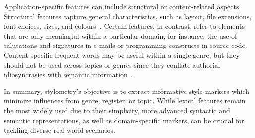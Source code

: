 Application-specific features can include structural or content-related aspects. 
Structural features capture general characteristics, such as layout, file extensions, font choices, sizes, and colours~\citep{abbasi_writeprints_2008,neal_surveying_2018}. 
Certain features, in contrast, refer to elements that are only meaningful within a particular domain, for instance, the use of salutations and signatures in e-mails or programming constructs in source code. 
Content-specific frequent words may be useful within a single genre, but they should not be used across topics or genres since they conflate authorial idiosyncrasies with semantic information~\citep{abbasi_writeprints_2008}.


In summary, stylometry's objective is to extract informative style markers which minimize influences from genre, register, or topic. 
While lexical features remain the most widely used due to their simplicity, more advanced syntactic and semantic representations, as well as domain-specific markers, can be crucial for tackling diverse real-world scenarios.
